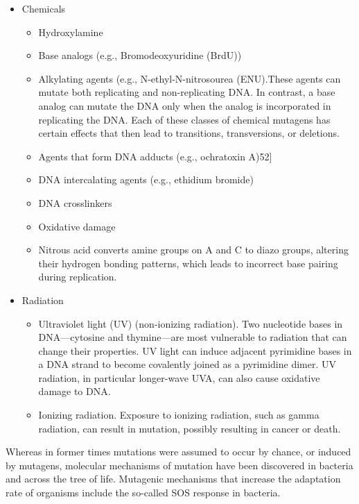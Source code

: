 \begin{itemize}
\item
  Chemicals

  \begin{itemize}
  \tightlist
  \item
    Hydroxylamine
  \item
    Base analogs (e.g., Bromodeoxyuridine (BrdU))
  \item
    Alkylating agents (e.g., N-ethyl-N-nitrosourea (ENU).These agents can mutate both replicating and non-replicating DNA. In contrast, a base analog can mutate the DNA only when the analog is incorporated in replicating the DNA. Each of these classes of chemical mutagens has certain effects that then lead to transitions, transversions, or deletions.
  \item
    Agents that form DNA adducts (e.g., ochratoxin A)52{]}
  \item
    DNA intercalating agents (e.g., ethidium bromide)
  \item
    DNA crosslinkers
  \item
    Oxidative damage
  \item
    Nitrous acid converts amine groups on A and C to diazo groups, altering their hydrogen bonding patterns, which leads to incorrect base pairing during replication.
  \end{itemize}
\item
  Radiation

  \begin{itemize}
  \tightlist
  \item
    Ultraviolet light (UV) (non-ionizing radiation). Two nucleotide bases in DNA---cytosine and thymine---are most vulnerable to radiation that can change their properties. UV light can induce adjacent pyrimidine bases in a DNA strand to become covalently joined as a pyrimidine dimer. UV radiation, in particular longer-wave UVA, can also cause oxidative damage to DNA.
  \item
    Ionizing radiation. Exposure to ionizing radiation, such as gamma radiation, can result in mutation, possibly resulting in cancer or death.
  \end{itemize}
\end{itemize}

Whereas in former times mutations were assumed to occur by chance, or induced by mutagens, molecular mechanisms of mutation have been discovered in bacteria and across the tree of life. Mutagenic mechanisms that increase the adaptation rate of organisms include the so-called SOS response in bacteria.

